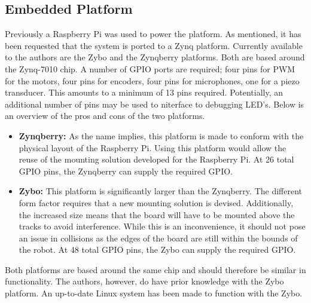 \documentclass[11pt]{article}
\begin{document}
\subsection{Embedded Platform} %
\label{sub:embedded_platform}
Previously a Raspberry Pi was used to power the platform.
As mentioned, it has been requested that the system is ported to a Zynq platform.
Currently available to the authors are the Zybo and the Zynqberry platforms.
Both are based around the Zynq-7010 chip.
A number of GPIO ports are required; four pins for PWM for the motors, four pins for encoders, four pins for microphones, one for a piezo transducer.
This amounts to a minimum of 13 pins required.
Potentially, an additional number of pins may be used to niterface to debugging LED's.  
Below is an overview of the pros and cons of the two platforms.
\begin{itemize}
	\item \textbf{Zynqberry:} As the name implies, this platform is made to conform with the physical layout of the Raspberry Pi.
	Using this platform would allow the reuse of the mounting solution developed for the Raspberry Pi.
	At 26 total GPIO pins, the Zynqberry can supply the required GPIO.
	\item \textbf{Zybo:} This platform is significantly larger than the Zynqberry.
	The different form factor requires that a new mounting solution is devised.
	Additionally, the increased size means that the board will have to be mounted above the tracks to avoid interference.
	While this is an inconvenience, it should not pose an issue in collisions as the edges of the board are still within the bounds of the robot.  
	At 48 total GPIO pins, the Zybo can supply the required GPIO.
\end{itemize}
Both platforms are based around the same chip and should therefore be similar in functionality. The authors, however, do have prior knowledge with the Zybo platform.
An up-to-date Linux system has been made to function with the Zybo.

\end{document}
